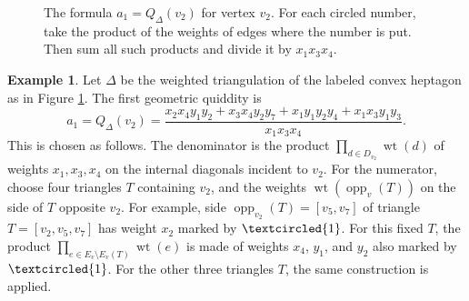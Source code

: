 \documentclass[amstex,11pt,reqno]{amsart}
\theoremstyle{definition}
\newtheorem{example}[theorem]{Example}
\newcommand{\wt}{\operatorname{wt}}
\begin{document}
\begin{figure}[h]
    \caption{The formula $a_1=Q_\Delta(v_2)$ for vertex $v_2$. For each circled number, take the product of the weights of edges
    where the number is put. Then sum all such products and divide it by $x_1x_3x_4$.}
    \label{fig:numerator_composition}
\end{figure}

\begin{example}
Let $\Delta$ be the weighted triangulation of the labeled convex heptagon as in Figure \ref{fig:numerator_composition}.
The first geometric quiddity is 
\[
a_1=Q_\Delta(v_2)= \frac{x_2 x_4 y_1 y_2 + x_3 x_4 y_2 y_7 + x_1 y_1 y_2 y_4 + x_1 x_3 y_1 y_3}{x_1 x_3 x_4}.
\]
This is chosen as follows. The denominator is the product
$\prod_{d\in D_{v_2}}\wt(d)$ of weights $x_1,x_3,x_4$ on the internal diagonals incident to $v_2$.
For the numerator, choose four triangles $T$ containing $v_2$, 
and the weights $\wt(\operatorname{opp}_v(T))$ on the side of $T$ opposite $v_2$. For example,
side $\operatorname{opp}_{v_2}(T)=[v_5,v_7]$ of triangle $T=[v_2,v_5,v_7]$ has weight $x_2$ 
marked by $\textcircled{\scriptsize 1}$.
For this fixed $T$, the product $\prod_{e\in E_v\setminus E_v(T)}\wt(e)$ is made of weights $x_4$, $y_1$, and $y_2$
also marked by $\textcircled{\scriptsize 1}$. For the other three triangles $T$, the same construction is
applied.
\end{example}
\end{document}

